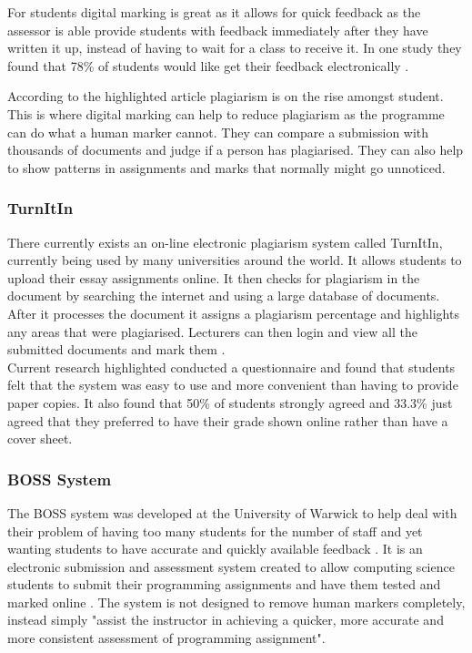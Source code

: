 \documentclass[12pt]{article}  %
\begin{document}
For students digital marking is great as it allows for quick feedback as the assessor is able provide students with feedback immediately after they have written it up, instead of having to wait for a class to receive it. In one study\cite{dahl_turnitin_2007} they found that 78\% of students would like get their feedback  electronically .

According to the highlighted article \cite{derby_duplication_2008} plagiarism is on the rise amongst student. This is where digital marking can help to reduce plagiarism as the programme can  do what a human marker cannot. They can compare a submission with thousands of documents and judge if a person has plagiarised. They can also help to show patterns in assignments and marks that normally might go unnoticed.


\newpage
\subsubsection{TurnItIn}
There currently exists an on-line electronic plagiarism system called TurnItIn, \cite{noauthor_turnitin_nodate} currently being used by many universities around the world. It allows students to upload their essay assignments online. It then checks for plagiarism in the document by searching the internet and using a large database of documents. After it processes the document it assigns a plagiarism percentage and highlights any areas that were plagiarised. Lecturers can then login and view all the submitted documents and mark them .\\
Current research highlighted \cite{dahl_turnitin_2007} conducted a questionnaire and found that students felt that the system was easy to use and more convenient than having to provide paper copies. It also found that 50\% of students strongly agreed and 33.3\% just agreed that they preferred to have their grade shown online rather than have a cover sheet.

\subsubsection{BOSS System}
The BOSS system  was developed at the University of Warwick to help deal with their problem of having too many students for the number of staff and yet wanting students to have accurate and quickly available feedback \cite{joy_boss_2005}.
It is an electronic submission and assessment system created to allow computing science students to submit their programming assignments and have them tested and marked online \cite{joy_effective_1998}. The system is not designed to remove human markers completely, instead simply "assist the instructor in achieving a quicker, more accurate and more consistent assessment of programming assignment"\cite{joy_boss_2005}.
\end{document}
